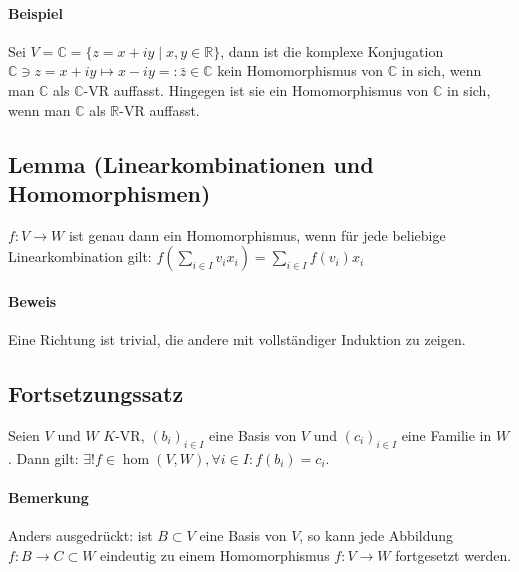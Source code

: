 \paragraph{Beispiel}
	Sei $V = \mathbb{C} = \{z = x+iy\mid x,y\in \mathbb{R}\}$, dann ist die komplexe Konjugation $\mathbb{C}\ni z = x+iy \mapsto x-iy =: \bar{z} \in \mathbb{C}$ kein Homomorphismus von $\mathbb{C}$ in sich, wenn man $\mathbb{C}$ als $\mathbb{C}$-VR auffasst. Hingegen ist sie ein Homomorphismus von $\mathbb{C}$ in sich, wenn man $\mathbb{C}$ als $ \mathbb{R} $-VR auffasst.
	
\subsection{Lemma (Linearkombinationen und Homomorphismen)}
	\begin{Lemma}
		$f:V\to W$ ist genau dann ein Homomorphismus, wenn für jede beliebige Linearkombination gilt: $f(\sum_{i\in I}v_ix_i) = \sum_{i\in I}f(v_i)x_i$
	\end{Lemma}

\paragraph{Beweis}
	Eine Richtung ist trivial, die andere mit vollständiger Induktion zu zeigen.

\subsection{Fortsetzungssatz} 
	\begin{Satz}[Fortsetzungssatz]
		Seien $ V $ und $ W $ $K$-VR, $(b_i)_{i\in I}$ eine Basis von $ V $ und $(c_i)_{i\in I}$ eine Familie in $ W $.
	Dann gilt: $\exists!f\in \hom(V,W), \forall i\in I: f(b_i) = c_i$.
	\end{Satz}
    
\paragraph{Bemerkung}
        Anders ausgedrückt: ist $B\subset V$ eine Basis von $ V $, so kann jede Abbildung $f: B\to C\subset W$ eindeutig zu einem Homomorphismus $f: V\to W$ fortgesetzt werden.
    

